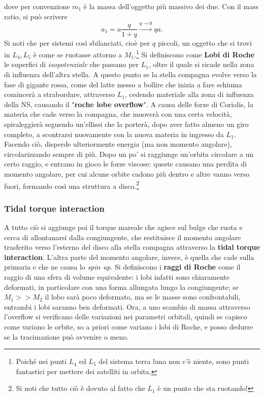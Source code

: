 dove per convenzione $m_1$ è la massa dell'oggetto più massivo dei due.
Con il mass ratio, si può scrivere
\begin{equation}
    a_1 = a\frac{q}{1+q}\xrightarrow{q\xrightarrow{}0} qa.
\end{equation}
Si noti che per sistemi così sbilanciati, cioè per $q$ piccoli, un oggetto che si trovi in $L_4,L_5$ è come se ruotasse attorno a $M_1$.\footnote{Poiché nei punti $L_4$ ed $L_5$ del sistema terra luna non c'è niente, sono punti fantastici per mettere dei satelliti in orbita.}
Si definiscono come \textbf{Lobi di Roche} le superfici di \textit{isopotenziale} che passano per $L_1$, oltre il quale si ricade nella zona di influenza dell'altra stella.
A questo punto se la stella compagna evolve verso la fase di gigante rossa, come del latte messo a bollire che inizia a fare schiuma comincerà a strabordare, attraverso $L_1$, cedendo materiale alla zona di influenza della NS, causando il "\textbf{roche lobe overflow}".
A causa delle forze di Coriolis, la materia che cade verso la compagna, che muoverà con una certa velocità, spiraleggierà seguendo un'ellissi che la porterà, dopo aver fatto almeno un giro completo, a scontrarsi nuovamente con la nuova materia in ingresso da $L_1$. Facendo ciò, disperde ulteriormente energia (ma non momento angolare), circolarizzando sempre di più.
Dopo un po' si raggiunge un'orbita circolare a un certo raggio, e entrano in gioco le forze viscose: queste causano una perdita di momento angolare, per cui alcune orbite cadono più dentro e altre vanno verso fuori, formando così una struttura a disco.\footnote{Si noti che tutto ciò è dovuto al fatto che $L_1$ è un punto che sta ruotando!}

\subsubsection{Tidal torque interaction}
A tutto ciò si aggiunge poi il torque mareale che agisce sul bulge che ruota e cerca di allontanarsi dalla congiungente, che restituisce il momento angolare trasferito verso l'esterno del disco alla stella compagna attraverso la \textbf{tidal torque interaction}.
L'altra parte del momento angolare, invece, è quella che cade sulla primaria e che ne causa lo \textit{spin up}.
Si definiscono i \textbf{raggi di Roche} come il raggio di una sfera di volume equivalente: 
i lobi infatti sono chiaramente deformati, in particolare con una forma allungata lungo la congiungente; se $M_1>>M_2$ il lobo sarà poco deformato, ma se le masse sono confrontabili, entrambi i lobi saranno ben deformati.
Ora, a uno scambio di massa attraverso l'overflow si verificano delle variazioni nei parametri orbitali, quindi se capisco come variano le orbite, so 
a priori come variano i lobi di Roche, e posso dedurre se la tracimazione può avvenire o meno.

